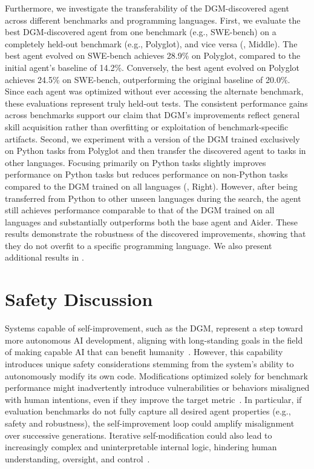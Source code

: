 \documentclass{article}
\begin{document}
Furthermore, we investigate the transferability of the DGM-discovered agent across different benchmarks and programming languages. First, we evaluate the best DGM-discovered agent from one benchmark (e.g., SWE-bench) on a completely held-out benchmark (e.g., Polyglot), and vice versa (, Middle). The best agent evolved on SWE-bench achieves 28.9\% on Polyglot, compared to the initial agent's baseline of 14.2\%. Conversely, the best agent evolved on Polyglot achieves 24.5\% on SWE-bench, outperforming the original baseline of 20.0\%. Since each agent was optimized without ever accessing the alternate benchmark, these evaluations represent truly held-out tests. The consistent performance gains across benchmarks support our claim that DGM's improvements reflect general skill acquisition rather than overfitting or exploitation of benchmark-specific artifacts. Second, we experiment with a version of the DGM trained exclusively on Python tasks from Polyglot and then transfer the discovered agent to tasks in other languages. Focusing primarily on Python tasks slightly improves performance on Python tasks but reduces performance on non-Python tasks compared to the DGM trained on all languages (, Right). However, after being transferred from Python to other unseen languages during the search, the agent still achieves performance comparable to that of the DGM trained on all languages and substantially outperforms both the base agent and Aider. These results demonstrate the robustness of the discovered improvements, showing that they do not overfit to a specific programming language. We also present additional results in .


\section{Safety Discussion}
\label{sec:safety}


Systems capable of self-improvement, such as the DGM, represent a step toward more autonomous AI development, aligning with long-standing goals in the field of making capable AI that can benefit humanity~\citep{schmidhuber1987evolutionary, clune2019ai, markoff2016machines, lehman2023machine}. However, this capability introduces unique safety considerations stemming from the system's ability to autonomously modify its own code. Modifications optimized solely for benchmark performance might inadvertently introduce vulnerabilities or behaviors misaligned with human intentions, even if they improve the target metric~\citep{bostrom2020ethical}. In particular, if evaluation benchmarks do not fully capture all desired agent properties (e.g., safety and robustness), the self-improvement loop could amplify misalignment over successive generations. Iterative self-modification could also lead to increasingly complex and uninterpretable internal logic, hindering human understanding, oversight, and control~\citep{sheth2025safety, anwar2024foundational, greenblatt2024alignment, ganguli2022red}.
\end{document}
